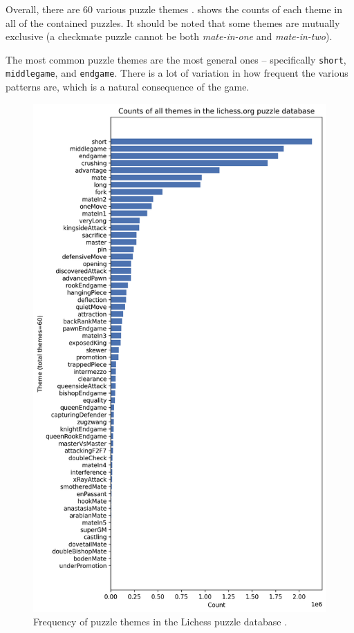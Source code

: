 Overall, there are 60 various puzzle themes \citep{lichessXML}.
 shows the counts of each theme in all of the contained
puzzles. It should be noted that some themes are mutually exclusive (a
checkmate puzzle cannot be both \emph{mate-in-one} and \emph{mate-in-two}).

The most common puzzle themes are the most general ones -- specifically
\texttt{short}, \texttt{middlegame}, and \texttt{endgame}. There is a lot of
variation in how frequent the various patterns are, which is a natural
consequence of the game.

\begin{figure}
  \centering
  \includegraphics[width=0.9\linewidth]{project/img/puzzle_theme_counts.png}
  \caption{Frequency of puzzle themes in the Lichess puzzle database
  \citep{lichessPuzzles}.}
  \label{dataThemeCounts}
\end{figure}

